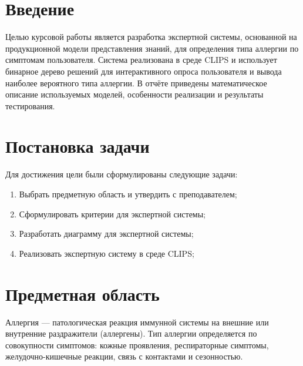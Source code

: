\documentclass[a4paper, final]{extarticle}
\begin{document}
	\section*{Введение}
	
	Целью курсовой работы является разработка экспертной системы, основанной на продукционной модели представления знаний, для определения типа аллергии по симптомам пользователя. Система реализована в среде CLIPS и использует бинарное дерево решений для интерактивного опроса пользователя и вывода наиболее вероятного типа аллергии. В отчёте приведены математическое описание используемых моделей, особенности реализации и результаты тестирования.
	
	\newpage
	
	\section{Постановка задачи}
	
	Для достижения цели были сформулированы следующие задачи:
	\begin{enumerate}
		\item Выбрать предметную область и утвердить с преподавателем;
		\item Сформулировать критерии для экспертной системы;
		\item Разработать диаграмму для экспертной системы;
		\item Реализовать экспертную систему в среде CLIPS;
	\end{enumerate}
	
	\newpage
	
	\section{Предметная область}
	
	Аллергия — патологическая реакция иммунной системы на внешние или внутренние раздражители (аллергены). Тип аллергии определяется по совокупности симптомов: кожные проявления, респираторные симптомы, желудочно-кишечные реакции, связь с контактами и сезонностью.
	
\end{document}
